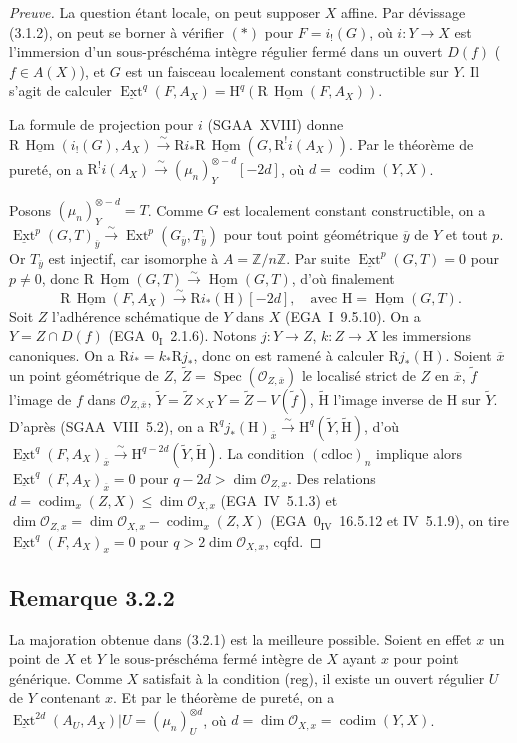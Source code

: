 \documentclass[11pt]{article}
\DeclareMathOperator{\codim}{codim}
\providecommand{\cO}{\mathcal{O}}
\providecommand{\wt}[1]{\widetilde{#1}}
\renewcommand{\H}{\mathrm{H}}
\DeclareMathOperator{\Hom}{Hom}
\DeclareMathOperator{\Ext}{Ext}
\DeclareMathOperator{\Spec}{Spec}
\newcommand{\R}{\mathrm{R}}
\newcommand{\Z}{\mathbb{Z}}
\newcommand{\ol}[1]{\overline{#1}}
\providecommand{\Hom}{\operatorname{Hom}}
\providecommand{\R}{\mathrm R}
\providecommand{\Z}{\mathbb Z}
\providecommand{\Spec}{\operatorname{Spec}}
\providecommand{\Spec}{\operatorname{Spec}}
\providecommand{\Hom}{\operatorname{Hom}}
\providecommand{\Spec}{\operatorname{Spec}}
\providecommand{\Spec}{\operatorname{Spec}}
\begin{document}
\begin{proof}[Preuve]
La question étant locale, on peut supposer $X$ affine. Par dévissage (3.1.2), on peut se borner à vérifier $(*)$ pour $F = i_{!}(G)$, où $i : Y \to X$ est l'immersion d'un sous-préschéma intègre régulier fermé dans un ouvert $D(f)$ ($f \in A(X)$), et $G$ est un faisceau localement constant constructible sur $Y$. Il s'agit de calculer $\underline{\Ext}^q(F, A_X) = \H^q(\R\,\underline{\Hom}(F, A_X))$.

La formule de projection pour $i$ (SGAA~XVIII) donne $\R\,\underline{\Hom}(i_{!}(G), A_X) \xrightarrow{\sim} \R i_{*} \R\,\underline{\Hom}(G, \R^{!}i(A_X))$. Par le théorème de pureté, on a $\R^{!}i(A_X) \xrightarrow{\sim} (\mu_n)^{\otimes -d}_Y[-2d]$, où $d = \codim(Y,X)$.

Posons $(\mu_n)^{\otimes -d}_Y = T$. Comme $G$ est localement constant constructible, on a $\underline{\Ext}^p(G,T)_{\ol{y}} \xrightarrow{\sim} \Ext^p(G_{\ol{y}}, T_{\ol{y}})$ pour tout point géométrique $\ol{y}$ de $Y$ et tout $p$. Or $T_{\ol{y}}$ est injectif, car isomorphe à $A = \Z/n\Z$. Par suite $\underline{\Ext}^p(G,T) = 0$ pour $p \neq 0$, donc $\R\,\underline{\Hom}(G,T) \xrightarrow{\sim} \underline{\Hom}(G,T)$, d'où finalement
\[
\R\,\underline{\Hom}(F, A_X) \xrightarrow{\sim} \R i_{*}(\H)[-2d], \quad \text{avec } \H = \underline{\Hom}(G,T).
\]
Soit $Z$ l'adhérence schématique de $Y$ dans $X$ (EGA~I~9.5.10). On a $Y = Z \cap D(f)$ (EGA~$0_{\mathrm{I}}$~2.1.6). Notons $j : Y \to Z$, $k : Z \to X$ les immersions canoniques. On a $\R i_{*} = k_{*} \R j_{*}$, donc on est ramené à calculer $\R j_{*}(\H)$. Soient $\ol{x}$ un point géométrique de $Z$, $\wt{Z} = \Spec(\cO_{Z,\ol{x}})$ le localisé strict de $Z$ en $\ol{x}$, $\wt{f}$ l'image de $f$ dans $\cO_{Z,\ol{x}}$, $\wt{Y} = \wt{Z} \times_X Y = \wt{Z} - V(\wt{f})$, $\wt{\H}$ l'image inverse de $\H$ sur $\wt{Y}$. D'après (SGAA~VIII~5.2), on a $\R^q j_{*}(\H)_{\ol{x}} \xrightarrow{\sim} \H^q(\wt{Y}, \wt{\H})$, d'où $\underline{\Ext}^q(F, A_X)_{\ol{x}} \xrightarrow{\sim} \H^{q-2d}(\wt{Y}, \wt{\H})$. La condition $(\mathrm{cdloc})_n$ implique alors $\underline{\Ext}^q(F, A_X)_{\ol{x}} = 0$ pour $q - 2d > \dim \cO_{Z,x}$. Des relations $d = \codim_{x}(Z,X) \leqslant \dim \cO_{X,x}$ (EGA~IV~5.1.3) et $\dim \cO_{Z,x} = \dim \cO_{X,x} - \codim_{x}(Z,X)$ (EGA~$0_{\mathrm{IV}}$~16.5.12 et IV~5.1.9), on tire $\underline{\Ext}^q(F, A_X)_x = 0$ pour $q > 2\dim \cO_{X,x}$, cqfd.
\end{proof}

\subsection*{Remarque 3.2.2}
La majoration obtenue dans (3.2.1) est la meilleure possible. Soient en effet $x$ un point de $X$ et $Y$ le sous-préschéma fermé intègre de $X$ ayant $x$ pour point générique. Comme $X$ satisfait à la condition (reg), il existe un ouvert régulier $U$ de $Y$ contenant $x$. Et par le théorème de pureté, on a $\underline{\Ext}^{2d}(A_U, A_X)|U = (\mu_n)^{\otimes d}_U$, où $d = \dim \cO_{X,x} = \codim(Y,X)$.
\end{document}
